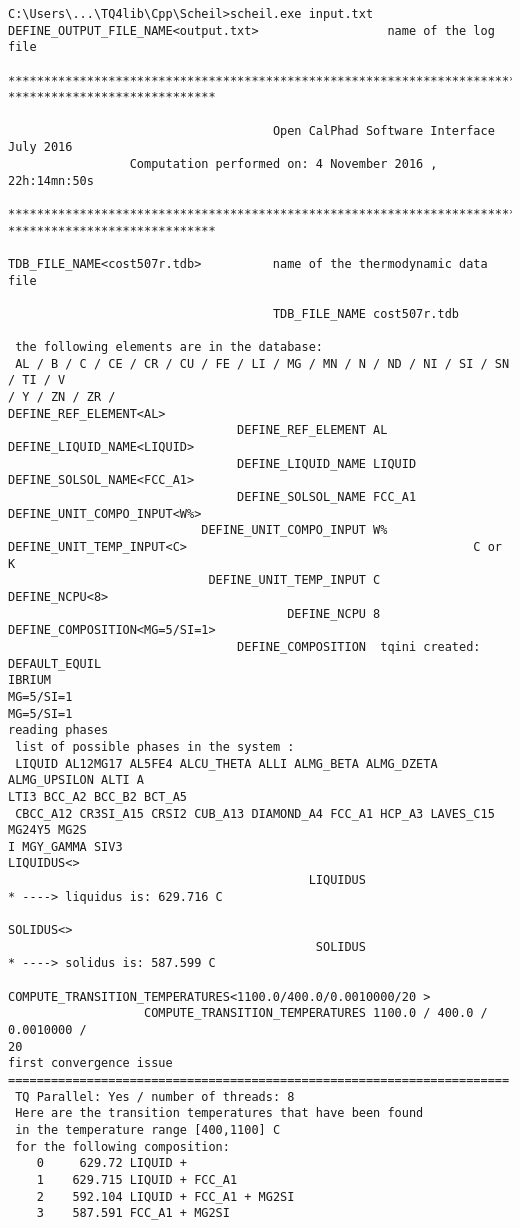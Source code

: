 \documentclass[12pt]{article}
\begin{document}
{\small
\begin{verbatim}
C:\Users\...\TQ4lib\Cpp\Scheil>scheil.exe input.txt
DEFINE_OUTPUT_FILE_NAME<output.txt>                  name of the log file

********************************************************************************
*****************************

                                     Open CalPhad Software Interface July 2016
                 Computation performed on: 4 November 2016 , 22h:14mn:50s

********************************************************************************
*****************************

TDB_FILE_NAME<cost507r.tdb>          name of the thermodynamic data file

                                     TDB_FILE_NAME cost507r.tdb

 the following elements are in the database:
 AL / B / C / CE / CR / CU / FE / LI / MG / MN / N / ND / NI / SI / SN / TI / V
/ Y / ZN / ZR /
DEFINE_REF_ELEMENT<AL>
                                DEFINE_REF_ELEMENT AL
DEFINE_LIQUID_NAME<LIQUID>
                                DEFINE_LIQUID_NAME LIQUID
DEFINE_SOLSOL_NAME<FCC_A1>
                                DEFINE_SOLSOL_NAME FCC_A1
DEFINE_UNIT_COMPO_INPUT<W%>
                           DEFINE_UNIT_COMPO_INPUT W%
DEFINE_UNIT_TEMP_INPUT<C>                                        C or K
                            DEFINE_UNIT_TEMP_INPUT C
DEFINE_NCPU<8>
                                       DEFINE_NCPU 8
DEFINE_COMPOSITION<MG=5/SI=1>
                                DEFINE_COMPOSITION  tqini created: DEFAULT_EQUIL
IBRIUM
MG=5/SI=1
MG=5/SI=1
reading phases
 list of possible phases in the system :
 LIQUID AL12MG17 AL5FE4 ALCU_THETA ALLI ALMG_BETA ALMG_DZETA ALMG_UPSILON ALTI A
LTI3 BCC_A2 BCC_B2 BCT_A5
 CBCC_A12 CR3SI_A15 CRSI2 CUB_A13 DIAMOND_A4 FCC_A1 HCP_A3 LAVES_C15 MG24Y5 MG2S
I MGY_GAMMA SIV3
LIQUIDUS<>
                                          LIQUIDUS
* ----> liquidus is: 629.716 C

SOLIDUS<>
                                           SOLIDUS
* ----> solidus is: 587.599 C

COMPUTE_TRANSITION_TEMPERATURES<1100.0/400.0/0.0010000/20 >
                   COMPUTE_TRANSITION_TEMPERATURES 1100.0 / 400.0 / 0.0010000 /
20
first convergence issue
======================================================================
 TQ Parallel: Yes / number of threads: 8
 Here are the transition temperatures that have been found
 in the temperature range [400,1100] C
 for the following composition:
    0     629.72 LIQUID +
    1    629.715 LIQUID + FCC_A1
    2    592.104 LIQUID + FCC_A1 + MG2SI
    3    587.591 FCC_A1 + MG2SI


\end{verbatim}}
\end{document}
